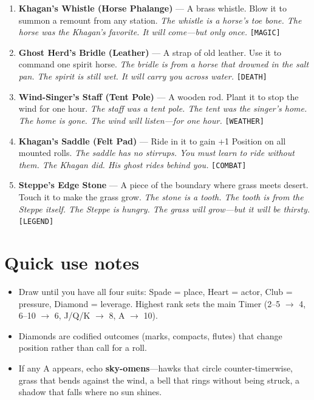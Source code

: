 \begin{enumerate}
\item \textbf{Khagan's Whistle (Horse Phalange)} --- A brass whistle. Blow it to summon a remount from any station.
  \hfill \textit{The whistle is a horse's toe bone. The horse was the Khagan's favorite. It will come---but only once.} \texttt{[MAGIC]}
\item[J] \textbf{Ghost Herd's Bridle (Leather)} --- A strap of old leather. Use it to command one spirit horse.
  \hfill \textit{The bridle is from a horse that drowned in the salt pan. The spirit is still wet. It will carry you across water.} \texttt{[DEATH]}
\item[Q] \textbf{Wind-Singer's Staff (Tent Pole)} --- A wooden rod. Plant it to stop the wind for one hour.
  \hfill \textit{The staff was a tent pole. The tent was the singer's home. The home is gone. The wind will listen---for one hour.} \texttt{[WEATHER]}
\item[K] \textbf{Khagan's Saddle (Felt Pad)} --- Ride in it to gain +1 Position on all mounted rolls.
  \hfill \textit{The saddle has no stirrups. You must learn to ride without them. The Khagan did. His ghost rides behind you.} \texttt{[COMBAT]}
\item[A] \textbf{Steppe's Edge Stone} --- A piece of the boundary where grass meets desert. Touch it to make the grass grow.
  \hfill \textit{The stone is a tooth. The tooth is from the Steppe itself. The Steppe is hungry. The grass will grow---but it will be thirsty.} \texttt{[LEGEND]}
\end{enumerate}

\section*{Quick use notes}
\label{sec:kuvani-quick-use}
\begin{itemize}
\item Draw until you have all four suits: Spade = place, Heart = actor, Club = pressure, Diamond = leverage. Highest rank sets the main Timer (2--5 \(\rightarrow\) 4, 6--10 \(\rightarrow\) 6, J/Q/K \(\rightarrow\) 8, A \(\rightarrow\) 10).
\item Diamonds are codified outcomes (marks, compacts, flutes) that change position rather than call for a roll.
\item If any A appears, echo \textbf{sky-omens}---hawks that circle counter-timerwise, grass that bends against the wind, a bell that rings without being struck, a shadow that falls where no sun shines.
\end{itemize}

